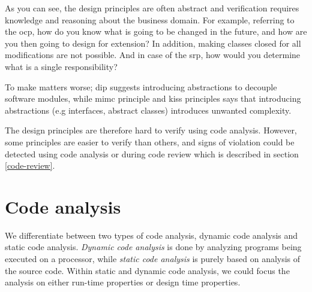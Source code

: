\documentclass{report}
\begin{document}
As you can see, the design principles are often abstract and verification requires knowledge and reasoning about the business domain. For example, referring to the \gls{ocp}, how do you know what is going to be changed in the future, and how are you then going to design for extension? In addition, making classes closed for all modifications are not possible. And in case of the \gls{srp}, how would you determine what is a single responsibility? 

To make matters worse; \gls{dip} suggests introducing abstractions to decouple software modules, while \gls{mimc} principle and \gls{kiss} principles says that introducing abstractions (e.g interfaces, abstract classes) introduces unwanted complexity.

The design principles are therefore hard to verify using code analysis. However, some principles are easier to verify than others, and signs of violation could be detected using code analysis or during code review which is described in section \ref{code-review}.

\section{Code analysis}
\label{code-analysis}
We differentiate between two types of code analysis, dynamic code analysis and static code analysis. \textit{Dynamic code analysis} is done by analyzing programs being executed on a processor, while \textit{static code analysis} is purely based on analysis of the source code. Within static and dynamic code analysis, we could focus the analysis on either run-time properties or design time properties.
\end{document}
